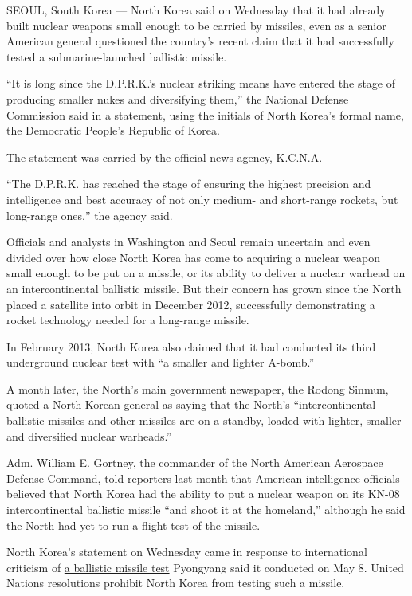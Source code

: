 SEOUL, South Korea --- North Korea said on Wednesday that it had already
built nuclear weapons small enough to be carried by missiles, even as a
senior American general questioned the country's recent claim that it
had successfully tested a submarine-launched ballistic missile.

``It is long since the D.P.R.K.'s nuclear striking means have entered
the stage of producing smaller nukes and diversifying them,'' the
National Defense Commission said in a statement, using the initials of
North Korea's formal name, the Democratic People's Republic of Korea.

The statement was carried by the official news agency, K.C.N.A.

``The D.P.R.K. has reached the stage of ensuring the highest precision
and intelligence and best accuracy of not only medium- and short-range
rockets, but long-range ones,'' the agency said.

Officials and analysts in Washington and Seoul remain uncertain and even
divided over how close North Korea has come to acquiring a nuclear
weapon small enough to be put on a missile, or its ability to deliver a
nuclear warhead on an intercontinental ballistic missile. But their
concern has grown since the North placed a satellite into orbit in
December 2012, successfully demonstrating a rocket technology needed for
a long-range missile.

In February 2013, North Korea also claimed that it had conducted its
third underground nuclear test with ``a smaller and lighter A-bomb.''

A month later, the North's main government newspaper, the Rodong Sinmun,
quoted a North Korean general as saying that the North's
``intercontinental ballistic missiles and other missiles are on a
standby, loaded with lighter, smaller and diversified nuclear
warheads.''

Adm. William E. Gortney, the commander of the North American Aerospace
Defense Command, told reporters last month that American intelligence
officials believed that North Korea had the ability to put a nuclear
weapon on its KN-08 intercontinental ballistic missile ``and shoot it at
the homeland,'' although he said the North had yet to run a flight test
of the missile.

North Korea's statement on Wednesday came in response to international
criticism of
\href{http://www.nytimes.com/2015/05/09/world/asia/north-korea-says-it-test-fired-missile-from-submarine.html}{a
ballistic missile test} Pyongyang said it conducted on May 8. United
Nations resolutions prohibit North Korea from testing such a missile.

